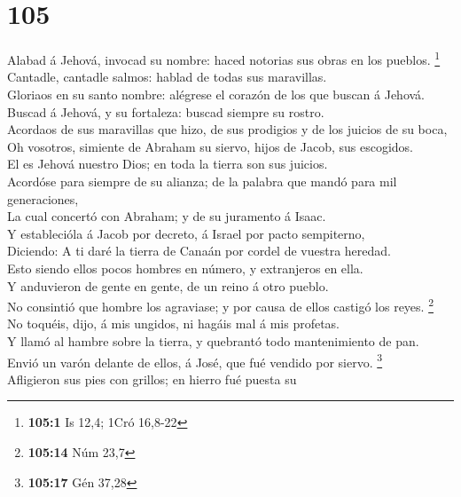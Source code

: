 \hypertarget{section-104}{%
\section{105}\label{section-104}}

 Alabad á Jehová, invocad su nombre: haced notorias sus
obras en los pueblos. \footnote{\textbf{105:1} Is 12,4; 1Cró 16,8-22}\\
 Cantadle, cantadle salmos: hablad de todas sus
maravillas.\\
 Gloriaos en su santo nombre: alégrese el corazón de los
que buscan á Jehová.\\
 Buscad á Jehová, y su fortaleza: buscad siempre su
rostro.\\
 Acordaos de sus maravillas que hizo, de sus prodigios y
de los juicios de su boca,\\
 Oh vosotros, simiente de Abraham su siervo, hijos de
Jacob, sus escogidos.\\
 El es Jehová nuestro Dios; en toda la tierra son sus
juicios.\\
 Acordóse para siempre de su alianza; de la palabra que
mandó para mil generaciones,\\
 La cual concertó con Abraham; y de su juramento á
Isaac.\\
 Y establecióla á Jacob por decreto, á Israel por pacto
sempiterno,\\
 Diciendo: A ti daré la tierra de Canaán por cordel de
vuestra heredad.\\
 Esto siendo ellos pocos hombres en número, y extranjeros
en ella.\\
 Y anduvieron de gente en gente, de un reino á otro
pueblo.\\
 No consintió que hombre los agraviase; y por causa de
ellos castigó los reyes. \footnote{\textbf{105:14} Núm 23,7}\\
 No toquéis, dijo, á mis ungidos, ni hagáis mal á mis
profetas.\\
 Y llamó al hambre sobre la tierra, y quebrantó todo
mantenimiento de pan.\\
 Envió un varón delante de ellos, á José, que fué vendido
por siervo. \footnote{\textbf{105:17} Gén 37,28}\\
 Afligieron sus pies con grillos; en hierro fué puesta su
